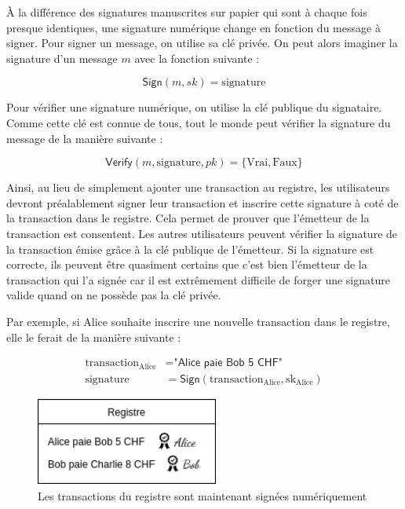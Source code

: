 À la différence des signatures manuscrites sur papier qui sont à chaque fois presque identiques, une signature numérique change en fonction du message à signer. Pour signer un message, on utilise sa clé privée. On peut alors imaginer la signature d'un message $m$ avec la fonction suivante :

\begin{equation*}
  \mathsf{Sign}(m, sk) = \mathrm{signature}
\end{equation*}

Pour vérifier une signature numérique, on utilise la clé publique du signataire. Comme cette clé est connue de tous, tout le monde peut vérifier la signature du message de la manière suivante :

\begin{equation*}
  \mathsf{Verify}(m, \mathrm{signature}, pk) = \mathrm{\{Vrai, Faux\}}
\end{equation*}

Ainsi, au lieu de simplement ajouter une transaction au registre, les utilisateurs devront préalablement signer leur transaction et inscrire cette signature à coté de la transaction dans le registre. Cela permet de prouver que l'émetteur de la transaction est consentent. Les autres utilisateurs peuvent vérifier la signature de la transaction émise grâce à la clé publique de l'émetteur. Si la signature est correcte, ils peuvent être quasiment certains que c'est bien l'émetteur de la transaction qui l'a signée car il est extrêmement difficile de forger une signature valide quand on ne possède pas la clé privée. 

Par exemple, si Alice souhaite inscrire une nouvelle transaction dans le registre, elle le ferait de la manière suivante :

\begin{align*}
  \mathrm{transaction_{Alice}} &= \textsf{"Alice paie Bob 5 CHF"}\\
  \mathrm{signature} &= \mathsf{Sign}(\mathrm{transaction_{Alice}, sk_{Alice}})
\end{align*}

\begin{figure}[H]
  \centering
  \includegraphics[width=6cm]{images/crypto_3.png}
  \caption{Les transactions du registre sont maintenant signées numériquement}
\end{figure}

